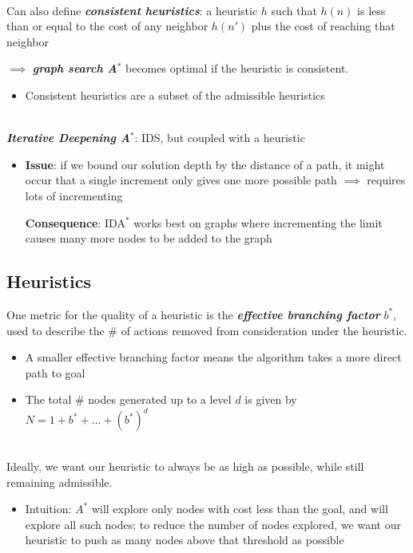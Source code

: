 \documentclass[12pt]{extarticle}
\theoremstyle{definition}
\theoremstyle{remark}
\newcommand{\pstart}[0]{\noindent}
\newcommand{\newp}[0]{~\\ \pstart}
\newcommand{\term}[1]{\noindent\textbf{\textit{#1}}}
\begin{document}
\vspace{8pt}
\newp
Can also define \term{consistent heuristics}: a heuristic $h$ such that $h(n)$ is less than or equal to the cost of any neighbor $h(n')$ plus the cost of reaching that neighbor

\vspace{5pt}
\pstart$\implies$ \term{graph search A$^\ast$} becomes optimal if the heuristic is consistent. \begin{itemize}
    \item Consistent heuristics are a subset of the admissible heuristics
\end{itemize}

~\\ \pstart
\term{Iterative Deepening A$^\ast$}: IDS, but coupled with a heuristic \begin{itemize}
    \item \textbf{Issue}: if we bound our solution depth by the distance of a path, it might occur that a single increment only gives one more possible path $\implies$ requires lots of incrementing

    \textbf{Consequence}: IDA$^\ast$ works best on graphs where incrementing the limit causes many more nodes to be added to the graph
\end{itemize}

    

\subsection{Heuristics}
One metric for the quality of a heuristic is the \term{effective branching factor} $b^\ast$, used to describe the \# of actions removed from consideration under the heuristic. \begin{itemize}
    \item A smaller effective branching factor means the algorithm takes a more direct path to goal
    \item The total \# nodes generated up to a level $d$ is given by $N=1+b^\ast+\hdots+(b^{\ast})^d$  
\end{itemize}

~\\ \pstart
Ideally, we want our heuristic to always be as high as possible, while still remaining admissible. \begin{itemize}
    \item Intuition: $A^\ast$ will explore only nodes with cost less than the goal, and will explore all such nodes; to reduce the number of nodes explored, we want our heuristic to push as many nodes above that threshold as possible
\end{itemize}
\end{document}
